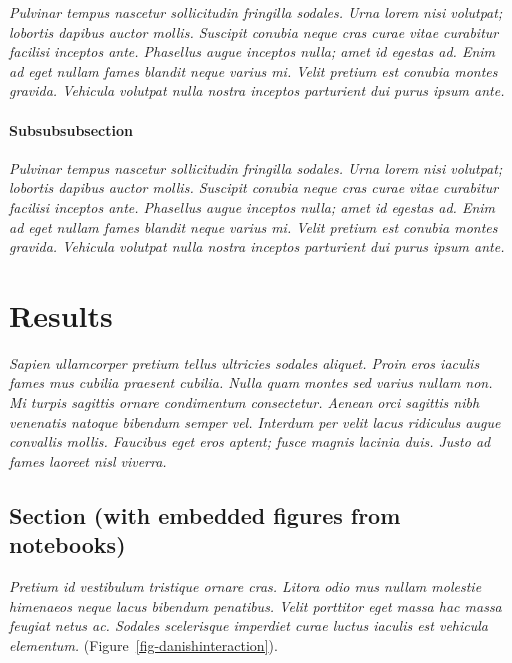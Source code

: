 \documentclass[
  10pt,
  a4paper,
]{scrbook}
\let\oldemph\emph
\renewcommand\emph[1]{\oldemph{\color{gray}#1}} %
\begin{document}
\emph{Pulvinar tempus nascetur sollicitudin fringilla sodales. Urna
lorem nisi volutpat; lobortis dapibus auctor mollis. Suscipit conubia
neque cras curae vitae curabitur facilisi inceptos ante. Phasellus augue
inceptos nulla; amet id egestas ad. Enim ad eget nullam fames blandit
neque varius mi. Velit pretium est conubia montes gravida. Vehicula
volutpat nulla nostra inceptos parturient dui purus ipsum ante.}

\subsubsection{Subsubsubsection}\label{subsubsubsection}

\emph{Pulvinar tempus nascetur sollicitudin fringilla sodales. Urna
lorem nisi volutpat; lobortis dapibus auctor mollis. Suscipit conubia
neque cras curae vitae curabitur facilisi inceptos ante. Phasellus augue
inceptos nulla; amet id egestas ad. Enim ad eget nullam fames blandit
neque varius mi. Velit pretium est conubia montes gravida. Vehicula
volutpat nulla nostra inceptos parturient dui purus ipsum ante.}

\chapter{Results}\label{results}

\emph{Sapien ullamcorper pretium tellus ultricies sodales aliquet. Proin
eros iaculis fames mus cubilia praesent cubilia. Nulla quam montes sed
varius nullam non. Mi turpis sagittis ornare condimentum consectetur.
Aenean orci sagittis nibh venenatis natoque bibendum semper vel.
Interdum per velit lacus ridiculus augue convallis mollis. Faucibus eget
eros aptent; fusce magnis lacinia duis. Justo ad fames laoreet nisl
viverra.}

\section{Section (with embedded figures from
notebooks)}\label{section-with-embedded-figures-from-notebooks}

\emph{Pretium id vestibulum tristique ornare cras. Litora odio mus
nullam molestie himenaeos neque lacus bibendum penatibus. Velit
porttitor eget massa hac massa feugiat netus ac. Sodales scelerisque
imperdiet curae luctus iaculis est vehicula elementum.}
(Figure~\ref{fig-danishinteraction}).
\end{document}
